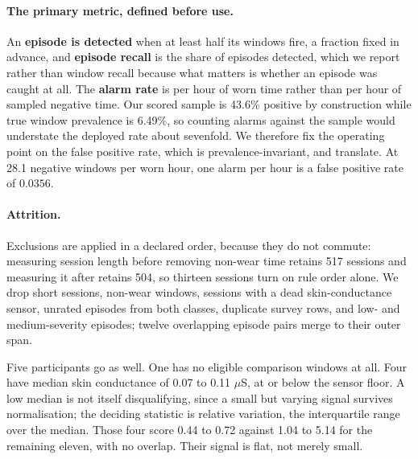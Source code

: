 \documentclass{article}
\begin{document}
\paragraph{The primary metric, defined before use.} An \textbf{episode is
detected} when at least half its windows fire, a fraction fixed in advance, and
\textbf{episode recall} is the share of episodes detected, which we report
rather than window recall because what matters is whether an episode was caught
at all. The \textbf{alarm rate} is per
hour of worn time rather than per hour of sampled negative time. Our scored
sample is 43.6\% positive by construction while true window prevalence is
6.49\%, so counting alarms against the sample would understate the deployed
rate about sevenfold. We therefore fix
the operating point on the false positive rate, which is prevalence-invariant,
and translate. At 28.1 negative windows per worn hour, one alarm per hour is a
false positive rate of $0.0356$.

\paragraph{Attrition.} Exclusions are applied in a declared order, because they
do not commute: measuring session length before removing non-wear time retains
517 sessions and measuring it after retains 504, so thirteen sessions turn on
rule order alone. We drop short sessions, non-wear windows, sessions with a
dead skin-conductance sensor, unrated episodes from both classes, duplicate
survey rows, and low- and medium-severity episodes; twelve overlapping episode
pairs merge to their outer span.

Five participants go as well. One has no eligible comparison windows at all.
Four have median skin conductance of 0.07 to 0.11 $\mu$S, at or below the
sensor floor. A low median is not itself disqualifying, since a small but
varying signal survives normalisation; the deciding statistic is relative
variation, the interquartile range over the median. Those four score 0.44 to
0.72 against 1.04 to 5.14 for the remaining eleven, with no overlap. Their
signal is flat, not merely small.
\end{document}
